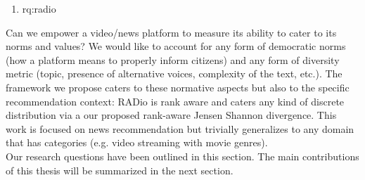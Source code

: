 
\begin{enumerate}[label=\textbf{RQ\arabic*},ref={RQ\arabic*},resume,leftmargin=*]
	\item \acl{rq:radio}\label{rq:radio}
\end{enumerate}

Can we empower a video/news platform to measure its ability to cater to its norms and values? We would like to account for any form of democratic norms (how a platform means to properly inform citizens) and any form of diversity metric (topic, presence of alternative voices, complexity of the text, etc.). The framework we propose caters to these normative aspects but also to the specific recommendation context: RADio is rank aware and caters any kind of discrete distribution via a our proposed rank-aware Jensen Shannon divergence. This work is focused on news recommendation but trivially generalizes to any domain that has categories (e.g. video streaming with movie genres).\\

Our research questions have been outlined in this section. The main contributions of this thesis will be summarized in the next section.










